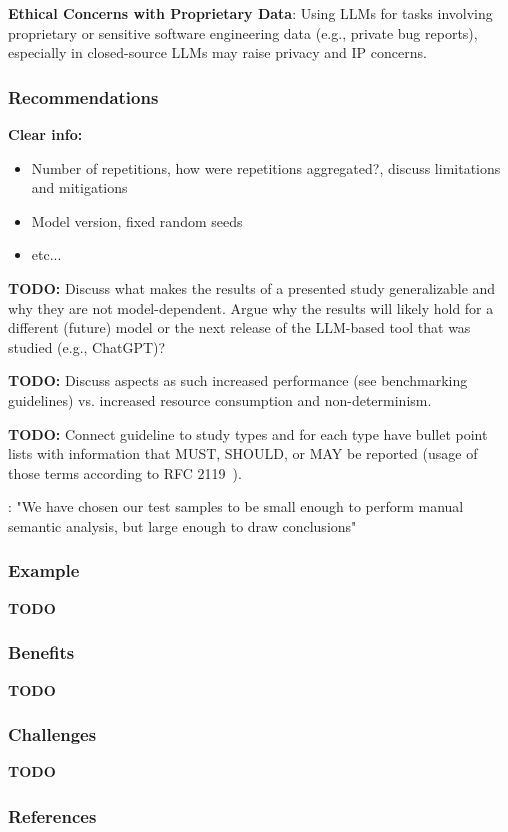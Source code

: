 \documentclass[11pt]{article}
\begin{document}
\textbf{Ethical Concerns with Proprietary Data}:
Using LLMs for tasks involving proprietary or sensitive software engineering data (e.g., private bug reports), especially in closed-source LLMs may raise privacy and IP concerns.

\subsubsection{Recommendations}

\textbf{Clear info:} 
\begin{itemize}
  \item Number of repetitions, how were repetitions aggregated?, discuss limitations and mitigations
  \item Model version, fixed random seeds
  \item etc...
\end{itemize}


\textbf{TODO:} Discuss what makes the results of a presented study generalizable and why they are not model-dependent. Argue why the results will likely hold for a different (future) model or the next release of the LLM-based tool that was studied (e.g., ChatGPT)?

\textbf{TODO:} Discuss aspects as such increased performance (see benchmarking guidelines) vs. increased resource consumption and non-determinism.

\textbf{TODO:} Connect guideline to study types and for each type have bullet point lists with information that MUST, SHOULD, or MAY be reported (usage of those terms according to RFC 2119~\cite{rfc2119}).

: "We have chosen our test samples to be small enough to perform manual semantic analysis, but large enough to draw conclusions"~\cite{tinnessoftware}

\subsubsection{Example}

\textbf{TODO}

\subsubsection{Benefits}

\textbf{TODO}

\subsubsection{Challenges}

\textbf{TODO}

\subsubsection{References}



\end{document}
